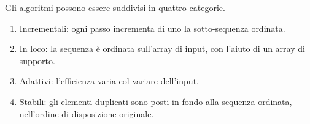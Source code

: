 \documentclass{subfiles}
\begin{document}
Gli algoritmi possono essere suddivisi in quattro categorie.

\begin{enumerate}
    \item Incrementali: ogni passo incrementa di uno la sotto-sequenza ordinata.
    \item In loco: la sequenza è ordinata sull'array di input, con l'aiuto di un array di supporto.
    \item Adattivi: l'efficienza varia col variare dell'input.
    \item Stabili: gli elementi duplicati sono posti in fondo alla sequenza ordinata, nell'ordine di disposizione originale.
\end{enumerate}
\end{document}
